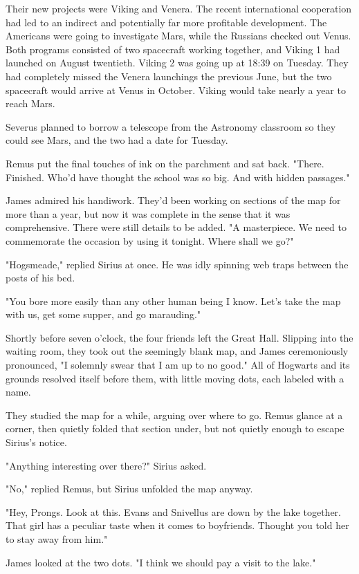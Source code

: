 \documentclass[a4paper,11pt]{article}
\begin{document}
Their new projects were Viking and Venera. The recent international cooperation had led to an indirect and potentially far more profitable development. The Americans were going to investigate Mars, while the Russians checked out Venus. Both programs consisted of two spacecraft working together, and Viking 1 had launched on August twentieth. Viking 2 was going up at 18:39 on Tuesday. They had completely missed the Venera launchings the previous June, but the two spacecraft would arrive at Venus in October. Viking would take nearly a year to reach Mars.

Severus planned to borrow a telescope from the Astronomy classroom so they could see Mars, and the two had a date for Tuesday.

Remus put the final touches of ink on the parchment and sat back. "There. Finished. Who'd have thought the school was so big. And with hidden passages."

James admired his handiwork. They'd been working on sections of the map for more than a year, but now it was complete in the sense that it was comprehensive. There were still details to be added. "A masterpiece. We need to commemorate the occasion by using it tonight. Where shall we go?"

"Hogsmeade," replied Sirius at once. He was idly spinning web traps between the posts of his bed.

"You bore more easily than any other human being I know. Let's take the map with us, get some supper, and go marauding."

Shortly before seven o'clock, the four friends left the Great Hall. Slipping into the waiting room, they took out the seemingly blank map, and James ceremoniously pronounced, "I solemnly swear that I am up to no good." All of Hogwarts and its grounds resolved itself before them, with little moving dots, each labeled with a name.

They studied the map for a while, arguing over where to go. Remus glance at a corner, then quietly folded that section under, but not quietly enough to escape Sirius's notice.

"Anything interesting over there?" Sirius asked.

"No," replied Remus, but Sirius unfolded the map anyway.

"Hey, Prongs. Look at this. Evans and Snivellus are down by the lake together. That girl has a peculiar taste when it comes to boyfriends. Thought you told her to stay away from him."

James looked at the two dots. "I think we should pay a visit to the lake."
\end{document}

